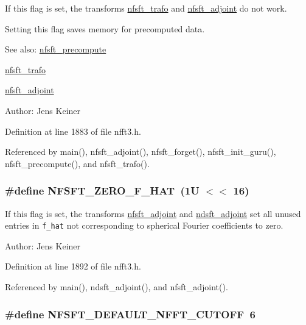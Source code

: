 If this flag is set, the transforms \hyperlink{group__nfsft_ga8}{nfsft\_\-trafo} and \hyperlink{group__nfsft_ga9}{nfsft\_\-adjoint} do not work. 

Setting this flag saves memory for precomputed data.

\begin{Desc}
\item[See also:]\hyperlink{group__nfsft_ga4}{nfsft\_\-precompute} 

\hyperlink{group__nfsft_ga8}{nfsft\_\-trafo} 

\hyperlink{group__nfsft_ga9}{nfsft\_\-adjoint} \end{Desc}
\begin{Desc}
\item[Author:]Jens Keiner \end{Desc}


Definition at line 1883 of file nfft3.h.

Referenced by main(), nfsft\_\-adjoint(), nfsft\_\-forget(), nfsft\_\-init\_\-guru(), nfsft\_\-precompute(), and nfsft\_\-trafo().\hypertarget{group__nfsft_ga39}{
\subsubsection[NFSFT\_\-ZERO\_\-F\_\-HAT]{\setlength{\rightskip}{0pt plus 5cm}\#define NFSFT\_\-ZERO\_\-F\_\-HAT~(1U $<$$<$ 16)}}
\label{group__nfsft_ga39}


If this flag is set, the transforms \hyperlink{group__nfsft_ga9}{nfsft\_\-adjoint} and \hyperlink{group__nfsft_ga7}{ndsft\_\-adjoint} set all unused entries in {\tt f\_\-hat} not corresponding to spherical Fourier coefficients to zero. 

\begin{Desc}
\item[Author:]Jens Keiner \end{Desc}


Definition at line 1892 of file nfft3.h.

Referenced by main(), ndsft\_\-adjoint(), and nfsft\_\-adjoint().\hypertarget{group__nfsft_ga46}{
\subsubsection[NFSFT\_\-DEFAULT\_\-NFFT\_\-CUTOFF]{\setlength{\rightskip}{0pt plus 5cm}\#define NFSFT\_\-DEFAULT\_\-NFFT\_\-CUTOFF~6}}
\label{group__nfsft_ga46}


